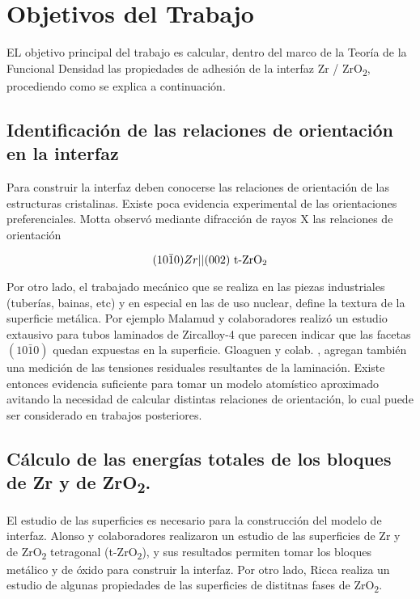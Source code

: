 \section{Objetivos del Trabajo}

EL objetivo principal del trabajo es calcular, dentro del marco de la Teoría de 
la Funcional Densidad las propiedades de adhesión de la interfaz Zr / ZrO\textsubscript{2}, 
procediendo como se explica a continuación.

\subsection{Identificación de las relaciones de orientación en la interfaz}

Para construir la interfaz deben conocerse las relaciones de orientación de las estructuras
cristalinas. Existe poca evidencia experimental de las orientaciones preferenciales. 
Motta\cite{Motta2011} observó mediante difracción de rayos X las relaciones de orientación

\begin{equation}
  (10\bar{1}0) Zr ||  \text{(002) t-ZrO\textsubscript{2}}
\end{equation}

Por otro lado, el trabajado mecánico que se realiza en las piezas industriales (tuberías, bainas, etc)
y en especial en las de uso nuclear, define la textura de la superficie metálica. Por ejemplo
Malamud y colaboradores \cite{Malamud2018} realizó un estudio extausivo para tubos laminados de Zircalloy-4
que parecen indicar que las facetas $(1 0 \bar{1} 0)$ quedan expuestas en la superficie. Gloaguen y colab.
\cite{Gloaguen2010}, agregan también una medición de las tensiones residuales resultantes de la 
laminación. Existe entonces evidencia suficiente para tomar un  modelo atomístico aproximado 
avitando la necesidad de calcular distintas relaciones de orientación, lo cual puede ser
considerado en trabajos posteriores.

\subsection{ Cálculo de las energías totales de los bloques de Zr y de ZrO\textsubscript{2}.}

El estudio de las superficies es necesario para la construcción del modelo de 
interfaz. Alonso y colaboradores \cite{Alonso2018} realizaron un estudio de las superficies de
Zr y de ZrO\textsubscript{2} tetragonal (t-ZrO\textsubscript{2}), y sus resultados permiten 
tomar los bloques metálico y de óxido para construir la interfaz. Por otro lado, Ricca
\cite{ricca2015revealing} realiza un estudio de algunas propiedades de las superficies de 
distitnas fases de ZrO\textsubscript{2}. 


